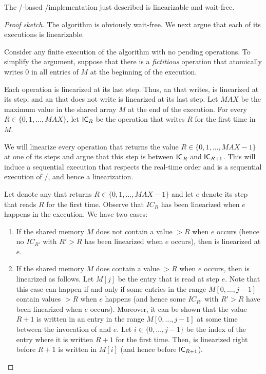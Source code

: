 \begin{theorem}
  The \R/\W-based \LL/\IC implementation just described is linearizable and wait-free.
\end{theorem}

\begin{proof}[Proof sketch]
The algorithm is obviously wait-free. We next argue that each of its executions is linearizable.

Consider any finite execution of the algorithm with no pending operations.  To simplify the argument, suppose that there is a \emph{fictitious} \IC operation that atomically writes 0 in all entries of $M$ at the beginning of the execution.

Each \IC operation is linearized at its last step. Thus, an \IC that writes, is linearized at its \W step, and an \IC that does not write is linearized at its last \R step.  Let $MAX$ be the maximum value in the shared array $M$ at the end of the execution.  For every $R \in \{0,1, \hdots, MAX\}$, let ${\sf \small IC}_R$ be the \IC operation that writes $R$ for the first time in $M$.

We will linearize every \LL operation that returns the value $R \in \{0, 1, \hdots, MAX-1\}$ at one of its steps and argue that this step is between ${\sf \small IC}_R$ and ${\sf \small IC}_{R+1}$.  This will induce a sequential execution that respects the real-time order and is a sequential execution of \LL/\IC, and hence a linearization.

Let \op denote any \LL that returns $R \in \{0, 1, \hdots, MAX-1\}$ and let $e$ denote its \R step that reads $R$ for the first time.  Observe that $IC_R$ has been linearized when $e$ happens in the execution.  We have two cases:

\begin{enumerate}
\item If the shared memory $M$ does not contain a value $> R$ when $e$ occurs (hence no $IC_{R'}$ with $R' > R$ has been linearized when $e$ occurs), then \op is linearized at $e$.

\item If the shared memory $M$ does contain a value $> R$ when $e$ occurs, then \op is linearized as follows.  Let $M[j]$ be the entry that is read at step $e$. Note that this case can happen if and only if some entries in the range $M[0, \hdots, j-1]$ contain values $> R$ when $e$ happens (and hence some $IC_{R'}$ with $R' > R$ have been linearized when $e$ occurs).  Moreover, it can be shown that the value $R+1$ is written in an entry in the range $M[0, \hdots, j-1]$ at some time between the invocation of \op and $e$.  Let $i \in \{0, \hdots, j-1\}$ be the index of the entry where it is written $R+1$ for the first time. Then, \op is linearized right before $R+1$ is written in $M[i]$ (and hence before ${\sf \small IC}_{R+1}$).
\end{enumerate}

\end{proof}

